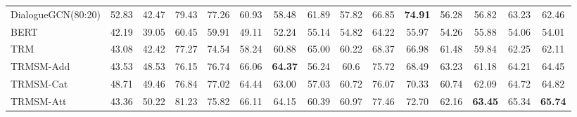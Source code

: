 \documentclass[letterpaper]{article} \usepackage{aaai21}  \usepackage{times}  \usepackage{helvet} \usepackage{courier}  \usepackage[hyphens]{url}  \usepackage{graphicx} \urlstyle{rm} \def\UrlFont{\rm}  \usepackage{natbib}  \usepackage{caption} \usepackage{multirow}
\begin{document}
\begin{table*}
{\begin{tabular}{@{}l|cccccccccccccc@{}}
DialogueGCN(80:20)              & 52.83                     & \multicolumn{1}{c|}{42.47}          & 79.43                     & \multicolumn{1}{c|}{77.26}          & 60.93                     & \multicolumn{1}{c|}{58.48}          & 61.89                     & \multicolumn{1}{c|}{57.82}          & 66.85                     & \multicolumn{1}{c|}{\textbf{74.91}} & 56.28                     & \multicolumn{1}{c|}{56.82}          & 63.23                     & 62.46          \\
BERT\cite{BERT}                     & 42.19                     & \multicolumn{1}{c|}{39.05}          & 60.45                     & \multicolumn{1}{c|}{59.91}          & 49.11                     & \multicolumn{1}{c|}{52.24}          & 55.14                     & \multicolumn{1}{c|}{54.82}          & 64.22                     & \multicolumn{1}{c|}{55.97}          & 54.26                     & \multicolumn{1}{c|}{55.88}          & 54.06                     & 54.01          \\ \hline
TRM                      & 43.08                     & \multicolumn{1}{c|}{42.42}          & 77.27                     & \multicolumn{1}{c|}{74.54}          & 58.24                     & \multicolumn{1}{c|}{60.88}          & 65.00                     & \multicolumn{1}{c|}{60.22}          & 68.37                     & \multicolumn{1}{c|}{66.98}          & 61.48                     & \multicolumn{1}{c|}{59.84}          & 62.25                     & 62.11          \\
TRMSM-Add                & 43.53                     & \multicolumn{1}{c|}{48.53}          & 76.15                     & \multicolumn{1}{c|}{76.74}          & 66.06                     & \multicolumn{1}{c|}{\textbf{64.37}} & 56.24                     & \multicolumn{1}{c|}{60.6}           & 75.72                     & \multicolumn{1}{c|}{68.49}          & 63.23                     & \multicolumn{1}{c|}{61.18}          & 64.21                     & 64.45          \\
TRMSM-Cat                & 48.71                     & \multicolumn{1}{c|}{49.46}          & 76.84                     & \multicolumn{1}{c|}{77.02}          & 64.44                     & \multicolumn{1}{c|}{63.00}          & 57.03                     & \multicolumn{1}{c|}{60.72}          & 76.07                     & \multicolumn{1}{c|}{70.33}          & 60.74                     & \multicolumn{1}{c|}{62.09}          & 64.72                     & 64.82          \\
TRMSM-Att                & 43.36                     & \multicolumn{1}{c|}{50.22} & 81.23                     & \multicolumn{1}{c|}{75.82}          & 66.11                     & \multicolumn{1}{c|}{64.15}          & 60.39                     & \multicolumn{1}{c|}{60.97}          & 77.46                     & \multicolumn{1}{c|}{72.70}          & 62.16                     & \multicolumn{1}{c|}{\textbf{63.45}} & 65.34                     & \textbf{65.74} \\ \bottomrule

\end{tabular}}
\end{table*}
\end{document}
